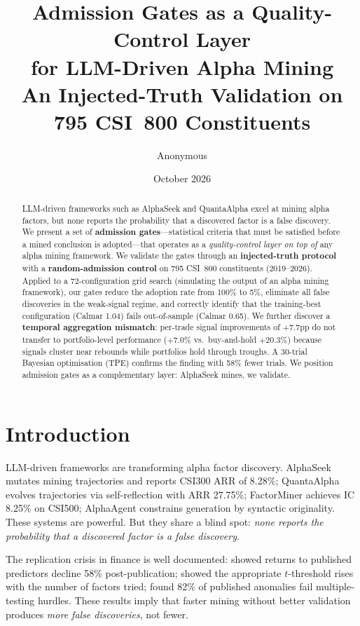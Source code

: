 \documentclass[11pt]{article}
\title{Admission Gates as a Quality-Control Layer\\
for LLM-Driven Alpha Mining\\
\large An Injected-Truth Validation on 795 CSI~800 Constituents}
\author{Anonymous}
\date{October 2026}
\begin{document}
\maketitle

\begin{abstract}
\noindent
LLM-driven frameworks such as AlphaSeek and QuantaAlpha excel at mining alpha
factors, but none reports the probability that a discovered factor is a false
discovery. We present a set of \textbf{admission gates}---statistical criteria
that must be satisfied before a mined conclusion is adopted---that operates as
a \emph{quality-control layer on top of} any alpha mining framework. We
validate the gates through an \textbf{injected-truth protocol} with a
\textbf{random-admission control} on 795 CSI~800 constituents (2019--2026).
Applied to a 72-configuration grid search (simulating the output of an alpha
mining framework), our gates reduce the adoption rate from 100\% to 5\%,
eliminate all false discoveries in the weak-signal regime, and correctly
identify that the training-best configuration (Calmar 1.04) fails
out-of-sample (Calmar 0.65). We further discover a \textbf{temporal
aggregation mismatch}: per-trade signal improvements of $+7.7$pp do not
transfer to portfolio-level performance ($+7.0\%$ vs.\ buy-and-hold
$+20.3\%$) because signals cluster near rebounds while portfolios hold
through troughs. A 30-trial Bayesian optimisation (TPE) confirms the finding
with 58\% fewer trials. We position admission gates as a complementary layer:
AlphaSeek mines, we validate.
\end{abstract}


\section{Introduction}

LLM-driven frameworks are transforming alpha factor discovery. AlphaSeek
\citep{alphaseek} mutates mining trajectories and reports CSI300 ARR of
8.28\%; QuantaAlpha \citep{quantaalpha} evolves trajectories via
self-reflection with ARR 27.75\%; FactorMiner \citep{factorMiner} achieves
IC 8.25\% on CSI500; AlphaAgent \citep{alphaagent} constrains generation by
syntactic originality. These systems are powerful. But they share a blind
spot: \emph{none reports the probability that a discovered factor is a false
discovery}.

The replication crisis in finance is well documented: \citet{mcleanpontiff}
showed returns to published predictors decline 58\% post-publication;
\citet{harveyliuzhu} showed the appropriate $t$-threshold rises with the
number of factors tried; \citet{houxuezhang} found 82\% of published
anomalies fail multiple-testing hurdles. These results imply that faster
mining without better validation produces \emph{more false discoveries}, not
fewer.
\end{document}
